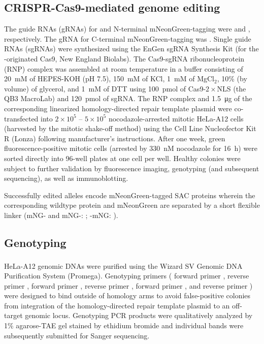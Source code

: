 \subsection{CRISPR-Cas9-mediated genome editing}
\label{CRISPRMethods}
The guide RNAs (gRNAs) for   and  N-terminal mNeonGreen-tagging were  and ,
respectively. The gRNA for   C-terminal mNeonGreen-tagging was . Single guide RNAs (sgRNAs) were synthesized using the EnGen sgRNA Synthesis Kit (for the -originated Cas9, New England Biolabs). The Cas9-sgRNA ribonucleoprotein (RNP) complex was assembled at room temperature in a buffer consisting of \SI{20}{mM} of HEPES-KOH (pH 7.5), \SI{150}{mM} of KCl, \SI{1}{mM} of MgCl$_2$, 10\% (by volume) of glycerol, and \SI{1}{mM} of DTT using \SI{100}{pmol} of Cas9-$2\times$NLS (the QB3 MacroLab) and \SI{120}{pmol} of sgRNA. The RNP complex and \SI{1.5}{\micro g} of the corresponding linearized homology-directed repair template plasmid were co-transfected into $2\times 10^5$ -- $5\times 10^5$ nocodazole-arrested mitotic HeLa-A12 cells \cite{CRISPRProtocol} (harvested by the mitotic shake-off method) using the Cell Line Nucleofector\texttrademark{} Kit R (Lonza) following manufacturer's instructions. After one week, green fluorescence-positive mitotic cells (arrested by \SI{330}{nM} nocodazole for \SI{16}{h}) were sorted directly into 96-well plates at one cell per well. Healthy colonies were subject to further validation by fluorescence imaging, genotyping (and subsequent sequencing), as well as immunoblotting.

Successfully edited alleles encode mNeonGreen-tagged SAC proteins wherein the corresponding wildtype protein and mNeonGreen are separated by a short flexible linker (mNG- and mNG-: ; -mNG: ).

\subsection{Genotyping}
HeLa-A12 genomic DNAs were purified using the Wizard\textsuperscript{\textregistered} SV Genomic DNA Purification System (Promega). Genotyping primers ( forward primer ,
 reverse primer ,
 forward primer ,
 reverse primer ,
 forward primer ,
and  reverse primer )
were designed to bind outside of homology arms to avoid false-positive colonies from integration of the homology-directed repair template plasmid to an off-target genomic locus. Genotyping PCR products were qualitatively analyzed by 1\% agarose-TAE gel stained by ethidium bromide and individual bands were subsequently submitted for Sanger sequencing.

